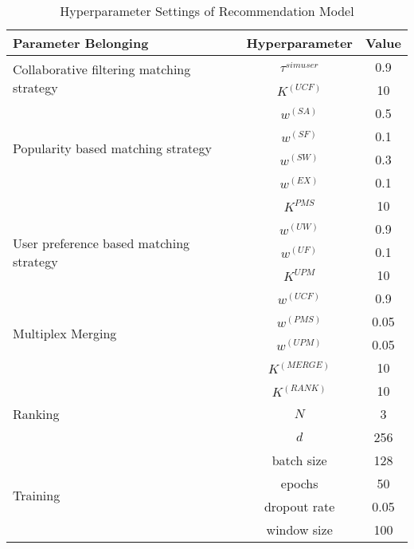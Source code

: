 \begin{table}[htbp!]
  \caption{Hyperparameter Settings of Recommendation Model}\label{table:ch4-hpsetting}
  \centering
  \begin{tabular}{l c c}
    \toprule
    Parameter Belonging       & Hyperparameter     & Value \\
    \midrule
    \multirow{2}{*}{Collaborative filtering matching strategy}
                              & \(\tau^{simuser}\) & 0.9   \\
                              & \(K^{(UCF)}\)      & 10    \\
    \midrule
    \multirow{4}{*}{Popularity based matching strategy}
                              & \(w^{(SA)}\)       & 0.5   \\
                              & \(w^{(SF)}\)       & 0.1   \\
                              & \(w^{(SW)}\)       & 0.3   \\
                              & \(w^{(EX)}\)       & 0.1   \\
                              & \(K^{PMS}\)        & 10    \\
    \midrule
    \multirow{3}{*}{User preference based matching strategy}
                              & \(w^{(UW)}\)       & 0.9   \\
                              & \(w^{(UF)}\)       & 0.1   \\
                              & \(K^{UPM}\)        & 10    \\
    \midrule
    \multirow{4}{*}{Multiplex Merging}
                              & \(w^{(UCF)}\)      & 0.9   \\
                              & \(w^{(PMS)}\)      & 0.05  \\
                              & \(w^{(UPM)}\)      & 0.05  \\
                              & \(K^{(MERGE)}\)    & 10    \\
    \midrule
    \multirow{3}{*}{Ranking}  & \(K^{(RANK)}\)     & 10    \\
                              & \(N\)              & 3     \\
                              & \(d\)              & 256   \\
    \midrule
    \multirow{4}{*}{Training} & batch size         & 128   \\
                              & epochs             & 50    \\
                              & dropout rate       & 0.05  \\
                              & window size        & 100   \\
    \bottomrule
  \end{tabular}
\end{table}


